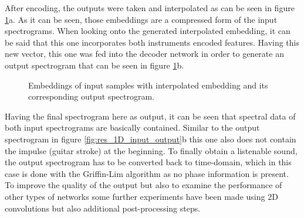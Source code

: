 After encoding, the outputs were taken and interpolated as can be seen in figure \ref{fig:res_1D_interpolation}a. As it can be seen, those embeddings are a compressed form of the input spectrograms. When looking onto the generated interpolated embedding, it can be said that this one incorporates both instruments encoded features. Having this new vector, this one was fed into the decoder network in order to generate an output spectrogram that can be seen in figure \ref{fig:res_1D_interpolation}b. 

\begin{figure}[htb!]
    \centering
    \captionsetup{justification=centering}
    \caption{Embeddings of input samples with interpolated embedding and its corresponding output spectrogram.}
    \label{fig:res_1D_interpolation}
\end{figure}

Having the final spectrogram here as output, it can be seen that spectral data of both input spectrograms are basically contained. Similar to the output spectrogram in figure \ref{fig:res_1D_input_output}b this one also does not contain the impulse (guitar stroke) at the beginning. To finally obtain a listenable sound, the output spectrogram has to be converted back to time-domain, which in this case is done with the Griffin-Lim algorithm \cite{Griffin1984} as no phase information is present. To improve the quality of the output but also to examine the performance of other types of networks some further experiments have been made using 2D convolutions but also additional post-processing steps.

